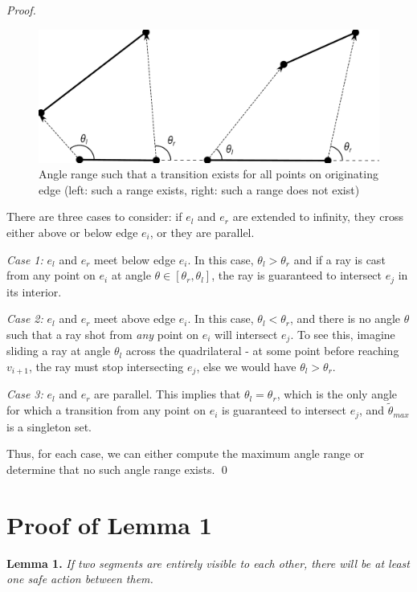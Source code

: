 \documentclass[]{styles/svproc}  %
\begin{document}
\begin{appendix}
\begin{proof}
\begin{figure}
    \centering
    \includegraphics[width=0.7\linewidth]{figures/bouncerange_min.pdf}
    \caption{Angle range such that a transition exists for all points on
originating edge (left: such a range exists, right: such a range does not
exist)}
\label{fig:bounce_range}
\end{figure}


There are three cases to consider: if $e_l$ and $e_r$ are extended to infinity,
they cross either above or below edge $e_i$, or they are parallel.

\emph{Case 1:} $e_l$ and $e_r$ meet below edge $e_i$. In this case,
$\theta_l > \theta_r$ and if a ray is cast from any point on $e_i$ at angle
$\theta \in [\theta_r, \theta_l]$, the ray is guaranteed to intersect $e_j$ in its
interior.

\emph{Case 2:} $e_l$ and $e_r$ meet above edge $e_i$. In this case, $\theta_l <
\theta_r$, and there is no angle
$\theta$ such that a ray shot from \emph{any} point on $e_i$ will intersect
$e_j$.
To see this, imagine sliding a ray at angle $\theta_l$ across the quadrilateral
- at some point before reaching $v_{i+1}$, the ray must stop intersecting $e_j$,
else we would have $\theta_l > \theta_r$.

\emph{Case 3:} $e_l$ and $e_r$ are parallel. This implies that $\theta_{l} =
\theta_{r}$, which is the only angle for which a transition from any
point on $e_i$ is guaranteed to intersect $e_j$, and $\tilde{\theta}_{max}$ is a
singleton set.

Thus, for each case, we can either compute the maximum angle range or determine
that no such angle range exists.
\qed

\end{proof}

\section{Proof of Lemma 1}

\textbf{Lemma 1.} {\em
If two segments are entirely visible to each other, there will be at least one safe
action between them.}


\end{appendix}
\end{document}
